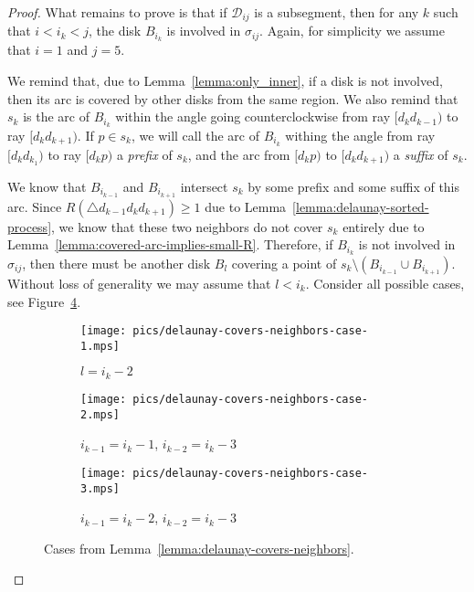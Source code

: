 \begin{appendices}
\begin{proof}
What remains to prove is that if $\mathcal{D}_{ij}$ is a subsegment, then for any
$k$ such that $i < i_k < j$, the disk $B_{i_k}$ is involved in $\sigma_{ij}$. Again, for simplicity we assume that $i = 1$ and $j = 5$.

We remind that, due to Lemma~\ref{lemma:only_inner}, if a disk is not involved, then its arc is covered by other disks from the same region. We also remind that $s_k$ is the arc of $B_{i_k}$ within the angle going counterclockwise from ray $[d_kd_{k-1})$ to ray $[d_kd_{k+1})$. If $p\in s_k$, we will call the arc of $B_{i_k}$ withing the angle from ray $[d_kd_{k_1})$ to ray $[d_kp)$ a \emph{prefix} of $s_k$, and the arc from $[d_kp)$ to $[d_kd_{k+1})$ a \emph{suffix} of $s_k$.

We know that $B_{i_{k-1}}$ and $B_{i_{k+1}}$ intersect $s_k$ by some prefix and some suffix of this arc. Since $R(\triangle d_{k-1}d_kd_{k+1})\geq 1$ due to Lemma~\ref{lemma:delaunay-sorted-process}, we know that these two neighbors do not cover $s_k$ entirely due to Lemma~\ref{lemma:covered-arc-implies-small-R}. Therefore, if $B_{i_k}$ is not involved in $\sigma_{ij}$, then there must be another disk $B_l$ covering a point of $s_k\setminus(B_{i_{k-1}}\cup B_{i_{k+1}})$. Without loss of generality we may assume that $l < i_k$. Consider all possible cases, see Figure~\ref{fig:delaunay-covers-neighbors-cases}.

\begin{figure}[h!]
    \centering
    \begin{subfigure}[t]{.26\textwidth}
    \texttt{[image: pics/delaunay-covers-neighbors-case-1.mps]}
    \caption{$l = i_k - 2$}
    \label{fig:delaunay-covers-neighbors-case-a}
    \end{subfigure}
    \begin{subfigure}[t]{.35\textwidth}
    \texttt{[image: pics/delaunay-covers-neighbors-case-2.mps]}
    \caption{$i_{k-1} = i_k - 1$, $i_{k-2} = i_k - 3$}
    \label{fig:delaunay-covers-neighbors-case-b}
    \end{subfigure}
    \begin{subfigure}[t]{.35\textwidth}
    \texttt{[image: pics/delaunay-covers-neighbors-case-3.mps]}
    \caption{$i_{k-1} = i_k - 2$, $i_{k-2} = i_k - 3$}
    \label{fig:delaunay-covers-neighbors-case-c}
    \end{subfigure}
    \caption{Cases from Lemma~\ref{lemma:delaunay-covers-neighbors}.}
    \label{fig:delaunay-covers-neighbors-cases}
\end{figure}


\end{proof}
\end{appendices}
